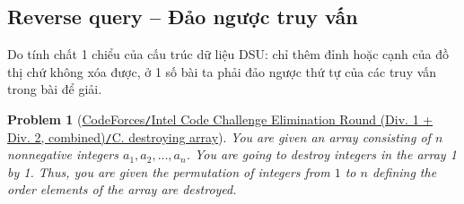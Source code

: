 \documentclass{article}
\newtheorem{problem}{Problem}
\begin{document}

\subsection{Reverse query -- Đảo ngược truy vấn}
Do tính chất 1 chiểu của cấu trúc dữ liệu DSU: chỉ thêm đỉnh hoặc cạnh của đồ thị chứ không xóa được, ở 1 số bài ta phải đảo ngược thứ tự của các truy vấn trong bài để giải.

\begin{problem}[\href{https://codeforces.com/contest/722/problem/C}{CodeForces{\tt/}Intel Code Challenge Elimination Round (Div. 1 + Div. 2, combined){\tt/}C. destroying array}]
    You are given an array consisting of $n$ nonnegative integers $a_1,a_2,\ldots,a_n$. You are going to destroy integers in the array 1 by 1. Thus, you are given the permutation of integers from $1$ to $n$ defining the order elements of the array are destroyed.


\end{problem}
\end{document}
